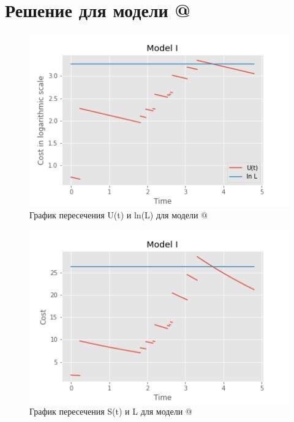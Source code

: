 \documentclass[a4paper,12pt]{article}
\makeatletter
\theoremstyle{definition}
\newcommand*{\rom}[1]{\expandafter\@slowromancap\romannumeral #1@}
\makeatother
\begin{document}
\section{Решение для модели \rom{1}}


\begin{figure}[htbp]
\label{fig:model1tracklcrosslog}
\centerline{\includegraphics[scale=0.7]{img/model1_with_L_log.png}}
\caption{График пересечения U(t) и ln(L) для модели \rom{1}}
\end{figure}


\begin{figure}[htbp]
\label{fig:model1tracklcross}
\centerline{\includegraphics[scale=0.7]{img/model1_with_L.png}}
\caption{График пересечения S(t) и L для модели \rom{1}}
\end{figure}
\end{document}
